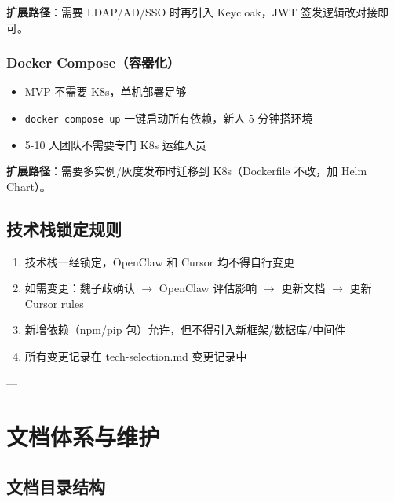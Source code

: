 \documentclass[11pt,a4paper]{article}
\begin{document}
\textbf{扩展路径}：需要 LDAP/AD/SSO 时再引入 Keycloak，JWT 签发逻辑改对接即可。

\subsubsection{Docker Compose（容器化）}

\begin{itemize}[nosep]
  \item MVP 不需要 K8s，单机部署足够
  \item \texttt{docker compose up} 一键启动所有依赖，新人 5 分钟搭环境
  \item 5-10 人团队不需要专门 K8s 运维人员
\end{itemize}

\textbf{扩展路径}：需要多实例/灰度发布时迁移到 K8s（Dockerfile 不改，加 Helm Chart）。

\subsection{技术栈锁定规则}

\begin{enumerate}[nosep]
  \item 技术栈一经锁定，OpenClaw 和 Cursor 均不得自行变更
  \item 如需变更：魏子政确认 $\to$ OpenClaw 评估影响 $\to$ 更新文档 $\to$ 更新 Cursor rules
  \item 新增依赖（npm/pip 包）允许，但不得引入新框架/数据库/中间件
  \item 所有变更记录在 tech-selection.md 变更记录中
\end{enumerate}

---

\section{文档体系与维护}

\subsection{文档目录结构}
\end{document}

